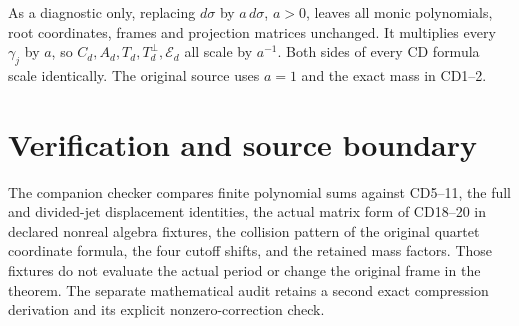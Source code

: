 As a diagnostic only, replacing \(d\sigma\) by \(a\,d\sigma\),
\(a>0\), leaves all monic polynomials, root coordinates, frames and
projection matrices unchanged. It multiplies every \(\gamma_j\) by
\(a\), so \(C_d,A_d,T_d,T_d^\perp,\mathcal E_d\) all scale by
\(a^{-1}\). Both sides of every CD formula scale identically.
The original source uses \(a=1\) and the exact mass in CD1--2.

\section{Verification and source boundary}

The companion checker compares finite polynomial sums against CD5--11,
the full and divided-jet displacement identities, the actual matrix
form of CD18--20 in declared nonreal algebra fixtures, the collision
pattern of the original quartet coordinate formula, the four cutoff
shifts, and the retained mass factors. Those fixtures do not evaluate
the actual period or change the original frame in the theorem.
The separate mathematical audit retains a second exact compression
derivation and its explicit nonzero-correction check.

